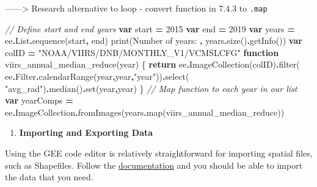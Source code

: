 \documentclass[
]{article}
\newenvironment{Shaded}{\begin{snugshade}}{\end{snugshade}}
\newcommand{\AttributeTok}[1]{\textcolor[rgb]{0.77,0.63,0.00}{#1}}
\newcommand{\CommentTok}[1]{\textcolor[rgb]{0.56,0.35,0.01}{\textit{#1}}}
\newcommand{\ControlFlowTok}[1]{\textcolor[rgb]{0.13,0.29,0.53}{\textbf{#1}}}
\newcommand{\DecValTok}[1]{\textcolor[rgb]{0.00,0.00,0.81}{#1}}
\newcommand{\FunctionTok}[1]{\textcolor[rgb]{0.00,0.00,0.00}{#1}}
\newcommand{\KeywordTok}[1]{\textcolor[rgb]{0.13,0.29,0.53}{\textbf{#1}}}
\newcommand{\NormalTok}[1]{#1}
\newcommand{\OperatorTok}[1]{\textcolor[rgb]{0.81,0.36,0.00}{\textbf{#1}}}
\newcommand{\StringTok}[1]{\textcolor[rgb]{0.31,0.60,0.02}{#1}}
\providecommand{\tightlist}{%
  \setlength{\itemsep}{0pt}\setlength{\parskip}{0pt}}
\begin{document}
------\textgreater{} Research alternative to loop - convert function in 7.4.3 to \texttt{.map}

\begin{Shaded}
\begin{Highlighting}[]
\CommentTok{// Define start and end years}
\KeywordTok{var}\NormalTok{ start }\OperatorTok{=} \DecValTok{2015}
\KeywordTok{var}\NormalTok{ end }\OperatorTok{=} \DecValTok{2019}
\KeywordTok{var}\NormalTok{ years }\OperatorTok{=}\NormalTok{ ee}\OperatorTok{.}\AttributeTok{List}\OperatorTok{.}\FunctionTok{sequence}\NormalTok{(start}\OperatorTok{,}\NormalTok{ end)}
\FunctionTok{print}\NormalTok{(}\StringTok{\textquotesingle{}Number of years: \textquotesingle{}}\OperatorTok{,}\NormalTok{ years}\OperatorTok{.}\FunctionTok{size}\NormalTok{()}\OperatorTok{.}\FunctionTok{getInfo}\NormalTok{())}
\KeywordTok{var}\NormalTok{ colID }\OperatorTok{=} \StringTok{"NOAA/VIIRS/DNB/MONTHLY\_V1/VCMSLCFG"}
\KeywordTok{function} \FunctionTok{viirs\_annual\_median\_reduce}\NormalTok{(year) \{}
    \ControlFlowTok{return}\NormalTok{ ee}\OperatorTok{.}\FunctionTok{ImageCollection}\NormalTok{(colID)}\OperatorTok{.}\FunctionTok{filter}\NormalTok{(            ee}\OperatorTok{.}\AttributeTok{Filter}\OperatorTok{.}\FunctionTok{calendarRange}\NormalTok{(year}\OperatorTok{,}\NormalTok{year}\OperatorTok{,}\StringTok{"year"}\NormalTok{))}\OperatorTok{.}\FunctionTok{select}\NormalTok{(}
      \StringTok{"avg\_rad"}\NormalTok{)}\OperatorTok{.}\FunctionTok{median}\NormalTok{()}\OperatorTok{.}\FunctionTok{set}\NormalTok{(}\StringTok{\textquotesingle{}year\textquotesingle{}}\OperatorTok{,}\NormalTok{year)}
\NormalTok{\}}
\CommentTok{// Map function to each year in our list}
\KeywordTok{var}\NormalTok{ yearComps }\OperatorTok{=}\NormalTok{ ee}\OperatorTok{.}\AttributeTok{ImageCollection}\OperatorTok{.}\FunctionTok{fromImages}\NormalTok{(years}\OperatorTok{.}\FunctionTok{map}\NormalTok{(viirs\_annual\_median\_reduce))}
\end{Highlighting}
\end{Shaded}

\begin{enumerate}
\def\labelenumi{\arabic{enumi}.}
\setcounter{enumi}{7}
\tightlist
\item
  \textbf{Importing and Exporting Data}
\end{enumerate}

Using the GEE code editor is relatively straightforward for importing spatial files, such as Shapefiles. Follow the \href{https://developers.google.com/earth-engine/guides/table_upload?hl=en}{documentation} and you should be able to import the data that you need.
\end{document}
